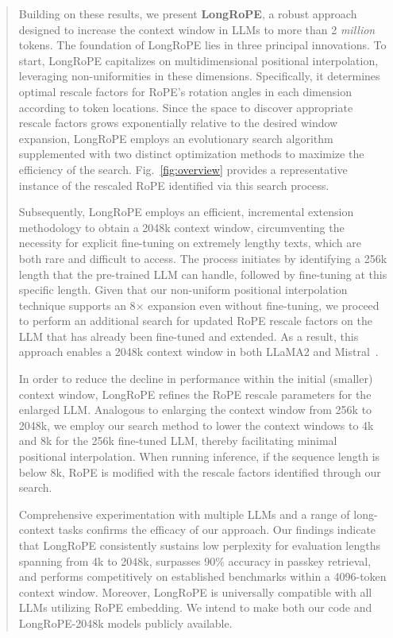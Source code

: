 \begin{abstract}
Building on these results, we present \textbf{LongRoPE}, a robust approach designed to increase the context window in LLMs to more than 2 \emph{million} tokens. The foundation of LongRoPE lies in three principal innovations. To start, {LongRoPE} capitalizes on multidimensional positional interpolation, leveraging non-uniformities in these dimensions. Specifically, it determines optimal rescale factors for RoPE's rotation angles in each dimension according to token locations. Since the space to discover appropriate rescale factors grows exponentially relative to the desired window expansion, {LongRoPE} employs an evolutionary search algorithm supplemented with two distinct optimization methods to maximize the efficiency of the search. Fig.~\ref{fig:overview} provides a representative instance of the rescaled RoPE identified via this search process.

Subsequently, {LongRoPE} employs an efficient, incremental extension methodology to obtain a 2048k context window, circumventing the necessity for explicit fine-tuning on extremely lengthy texts, which are both rare and difficult to access. The process initiates by identifying a 256k length that the pre-trained LLM can handle, followed by fine-tuning at this specific length. Given that our non-uniform positional interpolation technique supports an 8$\times$ expansion even without fine-tuning, we proceed to perform an additional search for updated RoPE rescale factors on the LLM that has already been fine-tuned and extended. As a result, this approach enables a 2048k context window in both LLaMA2 and Mistral~\cite{mistral}.

In order to reduce the decline in performance within the initial (smaller) context window, {LongRoPE} refines the RoPE rescale parameters for the enlarged LLM. Analogous to enlarging the context window from 256k to 2048k, we employ our search method to lower the context windows to 4k and 8k for the 256k fine-tuned LLM, thereby facilitating minimal positional interpolation. When running inference, if the sequence length is below 8k, RoPE is modified with the rescale factors identified through our search.

Comprehensive experimentation with multiple LLMs and a range of long-context tasks confirms the efficacy of our approach. Our findings indicate that LongRoPE consistently sustains low perplexity for evaluation lengths spanning from 4k to 2048k, surpasses 90\% accuracy in passkey retrieval, and performs competitively on established benchmarks within a 4096-token context window. Moreover, LongRoPE is universally compatible with all LLMs utilizing RoPE embedding. We intend to make both our code and LongRoPE-2048k models publicly available.


\end{abstract}
